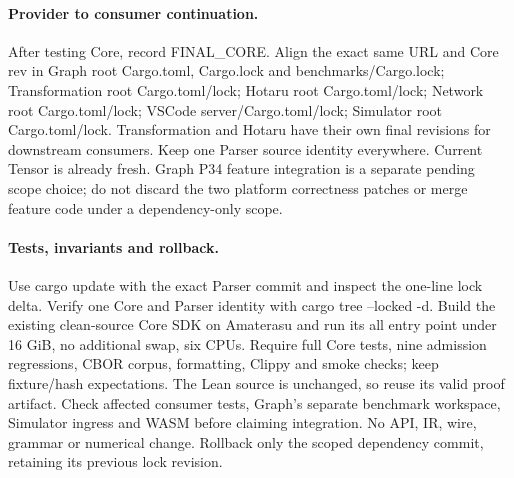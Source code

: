 \documentclass[11pt,a4paper]{article}
\begin{document}
\paragraph{Provider to consumer continuation.}
After testing Core, record FINAL\_CORE. Align the exact same URL and Core rev in
Graph root Cargo.toml, Cargo.lock and benchmarks/Cargo.lock; Transformation root
Cargo.toml/lock; Hotaru root Cargo.toml/lock; Network root Cargo.toml/lock;
VSCode server/Cargo.toml/lock; Simulator root Cargo.toml/lock. Transformation
and Hotaru have their own final revisions for downstream consumers. Keep one
Parser source identity everywhere. Current Tensor is already fresh. Graph P34
feature integration is a separate pending scope choice; do not discard the two
platform correctness patches or merge feature code under a dependency-only scope.
\paragraph{Tests, invariants and rollback.}
Use cargo update with the exact Parser commit and inspect the one-line lock delta.
Verify one Core and Parser identity with cargo tree --locked -d. Build the existing
clean-source Core SDK on Amaterasu and run its all entry point under 16 GiB,
no additional swap, six CPUs. Require full Core tests, nine admission regressions,
CBOR corpus, formatting, Clippy and smoke checks; keep fixture/hash expectations.
The Lean source is unchanged, so reuse its valid proof artifact. Check affected
consumer tests, Graph's separate benchmark workspace, Simulator ingress and WASM
before claiming integration. No API, IR, wire, grammar or numerical change.
Rollback only the scoped dependency commit, retaining its previous lock revision.
\end{document}
